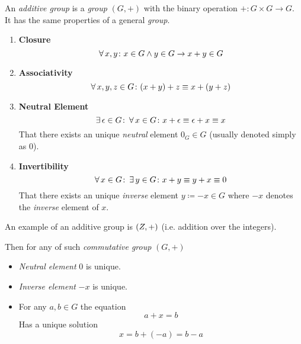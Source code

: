 \begin{definition}
    An \textit{additive group} is a \textit{group} $(G, +)$ with the binary operation $+ \colon G \times G \to G$. It has the same properties of a general \textit{group}.
    \begin{enumerate}
        \item \textbf{Closure}
        \begin{equation}
            \operatorname{\forall} x, y \colon x \in G \land y \in G \to x + y \in G
        \end{equation}
        \item \textbf{Associativity}
        \begin{equation}
            \operatorname{\forall} x, y, z \in G \colon (x + y) + z \equiv x + (y + z)
        \end{equation}
        \item \textbf{Neutral Element}
        \begin{equation}
            \operatorname{\exists} \epsilon \in G \colon \operatorname{\forall} x \in G \colon x + \epsilon \equiv \epsilon + x \equiv x
        \end{equation}
        That there exists an unique \textit{neutral} element $0_G \in G$ (usually denoted simply as $0$).
        \item \textbf{Invertibility}
        \begin{equation}
            \operatorname{\forall} x \in G \colon \operatorname{\exists} y \in G \colon x + y \equiv y + x \equiv 0
        \end{equation}
        That there exists an unique \textit{inverse} element $y \coloneqq -x \in G$ where $-x$ denotes the \textit{inverse} element of $x$.
    \end{enumerate}
\end{definition}

\begin{remark}
    An example of an additive group is $(\relax{Z}, +)$ (i.e. addition over the integers).
    
    Then for any of such \textit{commutative group} $(G, +)$
    \begin{itemize}
        \item \textit{Neutral element} $0$ is unique.
        \item \textit{Inverse element} $-x$ is unique.
        \item For any $a, b \in G$ the equation
        \begin{equation}
            a + x = b
        \end{equation}
        Has a unique solution
        \begin{equation}
            x = b + (-a) = b - a
        \end{equation}
    \end{itemize}
\end{remark}

